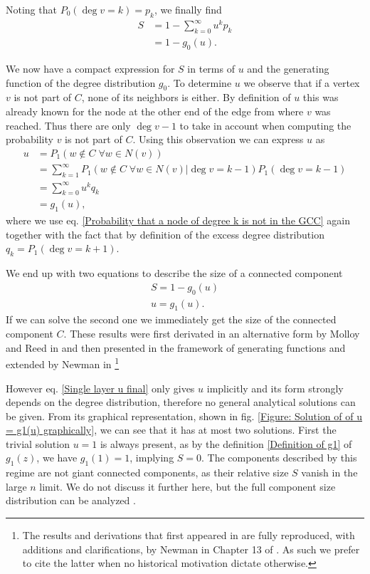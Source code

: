 \documentclass[
11pt, %
english, %
singlespacing, %
nolistspacing, %
liststotoc, %
headsepline, %
]{MastersDoctoralThesis} %
\begin{document}
Noting that $P_0(\deg{v} = k) = p_k$, we finally find
\begin{align}
	S	&= 1 - \sum_{k=0}^\infty u^k p_k \\
		&= 1 - g_0(u).
\end{align}

We now have a compact expression for $S$ in terms of $u$ and the generating function of the degree distribution $g_0$. To determine $u$ we observe that if a vertex $v$ is not part of $C$, none of its neighbors is either. By definition of $u$ this was already known for the node at the other end of the edge from where $v$ was reached. Thus there are only $\deg{v} - 1$ to take in account when computing the probability $v$ is not part of $C$. Using this observation we can express $u$ as
\begin{align}
	u 	&= P_1(w \notin C \; \forall w \in N(v)) \\
		&= \sum_{k=1}^\infty P_1(w \notin C \; \forall w \in N(v)| \deg{v} = k - 1) P_1(\deg{v} = k - 1) \\
		&= \sum_{k=0}^\infty u^k q_k \\
		&= g_1(u),
\end{align}
where we use eq. \eqref{Probability that a node of degree k is not in the GCC} again together with the fact that by definition of the excess degree distribution $q_k = P_1(\deg{v} = k + 1)$.

We end up with two equations to describe the size of a connected component
\begin{align}
	S = 1 - g_0(u) \label{Single layer S final} \\
	u = g_1(u). \label{Single layer u final}
\end{align}
If we can solve the second one we immediately get the size of the connected component $C$. These results were first derivated in an alternative form by Molloy and Reed in \cite{molloy1995critical} and then presented in the framework of generating functions and extended by Newman \etal{} in \cite{newman2001random}\footnote{The results and derivations that first appeared in \cite{newman2001random} are fully reproduced, with additions and clarifications, by Newman in Chapter 13 of \cite{newman2010networks}. As such we prefer to cite the latter when no historical motivation dictate otherwise.}

However eq. \eqref{Single layer u final} only gives $u$ implicitly and its form strongly depends on the degree distribution, therefore no general analytical solutions can be given. From its graphical representation, shown in fig. \ref{Figure: Solution of of u = g1(u) graphically}, we can see that it has at most two solutions. First the trivial solution $u = 1$ is always present, as by the definition \eqref{Definition of g1} of $g_1(z)$, we have $g_1(1) = 1$, implying $S = 0$. The components described by this regime are not giant connected components, as their relative size $S$ vanish in the large $n$ limit. We do not discuss it further here, but the full component size distribution can be analyzed \cite{newman2010networks, kryven2017general}.
\end{document}
